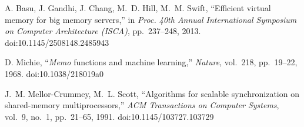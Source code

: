  A. Basu, J. Gandhi, J. Chang, M.~D. Hill, M.~M. Swift, ``Efficient virtual
  memory for big memory servers,'' in \emph{Proc. 40th Annual International Symposium on Computer
  Architecture (ISCA)}, pp.~237--248, 2013. doi:10.1145/2508148.2485943

 D. Michie, ``\emph{Memo} functions and machine learning,'' \emph{Nature},
  vol.~218, pp.~19--22, 1968. doi:10.1038/218019a0

 J.~M. Mellor-Crummey, M.~L. Scott, ``Algorithms for scalable synchronization on
  shared-memory multiprocessors,'' \emph{ACM Transactions on Computer Systems}, vol.~9, no.~1,
  pp.~21--65, 1991. doi:10.1145/103727.103729
